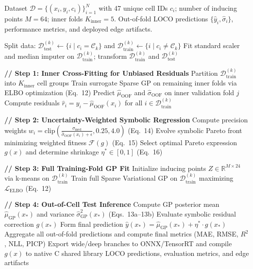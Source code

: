 \documentclass[a4paper,fleqn]{cas-sc}
\begin{document}
\begin{algorithm}[htbp]
\caption{WD-GPR-SR Training and LOCO Evaluation Protocol}
\label{alg:wd_gpr_sr}
\begin{algorithmic}[1]
\REQUIRE Dataset $\mathcal{D} = \{(x_i, y_i, c_i)\}_{i=1}^N$ with 47 unique cell IDs $c_i$; number of inducing points $M=64$; inner folds $K_{\text{inner}}=5$.
\ENSURE Out-of-fold LOCO predictions $\{\hat{y}_i, \hat{\sigma}_i\}$, performance metrics, and deployed edge artifacts.

    \STATE Split data: $\mathcal{D}_{\text{test}}^{(k)} \leftarrow \{i \mid c_i = \mathcal{C}_k\}$ and $\mathcal{D}_{\text{train}}^{(k)} \leftarrow \{i \mid c_i \neq \mathcal{C}_k\}$
    \STATE Fit standard scaler and median imputer on $\mathcal{D}_{\text{train}}^{(k)}$; transform $\mathcal{D}_{\text{train}}^{(k)}$ and $\mathcal{D}_{\text{test}}^{(k)}$
    
    \STATE \textbf{// Step 1: Inner Cross-Fitting for Unbiased Residuals}
    \STATE Partition $\mathcal{D}_{\text{train}}^{(k)}$ into $K_{\text{inner}}$ cell groups
        \STATE Train surrogate Sparse GP on remaining inner folds via ELBO optimization (Eq.~12)
        \STATE Predict $\hat{\mu}_{\text{OOF}}$ and $\hat{\sigma}_{\text{OOF}}$ on inner validation fold $j$
    \ENDFOR
    \STATE Compute residuals $\hat{r}_i = y_i - \hat{\mu}_{\text{OOF}}(x_i)$ for all $i \in \mathcal{D}_{\text{train}}^{(k)}$
    
    \STATE \textbf{// Step 2: Uncertainty-Weighted Symbolic Regression}
    \STATE Compute precision weights $w_i = \text{clip}\left(\frac{\sigma_{\text{med}}}{\hat{\sigma}_{\text{OOF}}(x_i) + \epsilon}, 0.25, 4.0\right)$ (Eq.~14)
    \STATE Evolve symbolic Pareto front minimizing weighted fitness $\mathcal{F}(g)$ (Eq.~15)
    \STATE Select optimal Pareto expression $g(x)$ and determine shrinkage $\eta^* \in [0, 1]$ (Eq.~16)
    
    \STATE \textbf{// Step 3: Full Training-Fold GP Fit}
    \STATE Initialize inducing points $Z \in \mathbb{R}^{M \times 24}$ via k-means on $\mathcal{D}_{\text{train}}^{(k)}$
    \STATE Train full Sparse Variational GP on $\mathcal{D}_{\text{train}}^{(k)}$ maximizing $\mathcal{L}_{\text{ELBO}}$ (Eq.~12)
    
    \STATE \textbf{// Step 4: Out-of-Cell Test Inference}
        \STATE Compute GP posterior mean $\hat{\mu}_{\text{GP}}(x_*)$ and variance $\hat{\sigma}_{\text{GP}}^2(x_*)$ (Eqs.~13a--13b)
        \STATE Evaluate symbolic residual correction $g(x_*)$
        \STATE Form final prediction $\hat{y}(x_*) = \hat{\mu}_{\text{GP}}(x_*) + \eta^* \cdot g(x_*)$
    \ENDFOR
\ENDFOR
\STATE Aggregate all out-of-fold predictions and compute final metrics (MAE, RMSE, $R^2$, NLL, PICP)
\STATE Export wide/deep branches to ONNX/TensorRT and compile $g(x)$ to native C shared library
\RETURN LOCO predictions, evaluation metrics, and edge artifacts
\end{algorithmic}
\end{algorithm}
\end{document}
